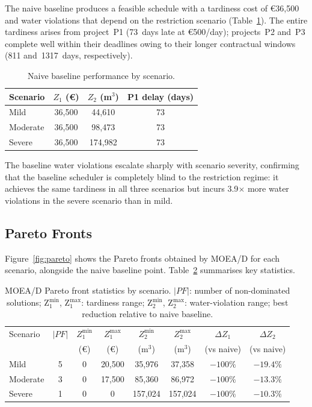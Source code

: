 \documentclass[12pt,a4paper]{article}
\newcommand{\Z}[1]{Z_{#1}}
\begin{document}
The naive baseline produces a feasible schedule with a tardiness cost of
\euro36,500 and water violations that depend on the restriction scenario
(Table~\ref{tab:baseline}).  The entire tardiness arises from project~P1 (73~days
late at \euro500/day); projects~P2 and~P3 complete well within their deadlines owing
to their longer contractual windows (811 and~1317~days, respectively).

\begin{table}[h]
\caption{Naive baseline performance by scenario.}
\label{tab:baseline}
\centering
\begin{tabular}{lccc}
\toprule
Scenario & $\Z{1}$ (\euro{}) & $\Z{2}$ (m$^3$) & P1 delay (days) \\
\midrule
Mild     & 36,500 &  44,610 & 73 \\
Moderate & 36,500 &  98,473 & 73 \\
Severe   & 36,500 & 174,982 & 73 \\
\bottomrule
\end{tabular}
\end{table}

The baseline water violations escalate sharply with scenario severity, confirming
that the baseline scheduler is completely blind to the restriction regime: it
achieves the same tardiness in all three scenarios but incurs 3.9$\times$ more water
violations in the severe scenario than in mild.

\subsection{Pareto Fronts}
\label{sec:results:pareto}

Figure~\ref{fig:pareto} shows the Pareto fronts obtained by MOEA/D for each scenario,
alongside the naive baseline point.  Table~\ref{tab:pf} summarises key statistics.

\begin{table}[h]
\caption{MOEA/D Pareto front statistics by scenario. $|PF|$: number of
non-dominated solutions; Z$_1^{\min}$, Z$_1^{\max}$: tardiness range;
Z$_2^{\min}$, Z$_2^{\max}$: water-violation range; best reduction relative to
naive baseline.}
\label{tab:pf}
\centering
\begin{tabular}{lccccccc}
\toprule
Scenario & $|PF|$ & $Z_1^{\min}$ & $Z_1^{\max}$ & $Z_2^{\min}$ & $Z_2^{\max}$ &
$\Delta Z_1$ & $\Delta Z_2$ \\
 & & (\euro{}) & (\euro{}) & (m$^3$) & (m$^3$) & (vs naive) & (vs naive) \\
\midrule
Mild     & 5 &      0 & 20,500 &  35,976 &  37,358 & $-100\%$ & $-19.4\%$ \\
Moderate & 3 &      0 & 17,500 &  85,360 &  86,972 & $-100\%$ & $-13.3\%$ \\
Severe   & 1 &      0 &      0 & 157,024 & 157,024 & $-100\%$ & $-10.3\%$ \\
\bottomrule
\end{tabular}
\end{table}
\end{document}
